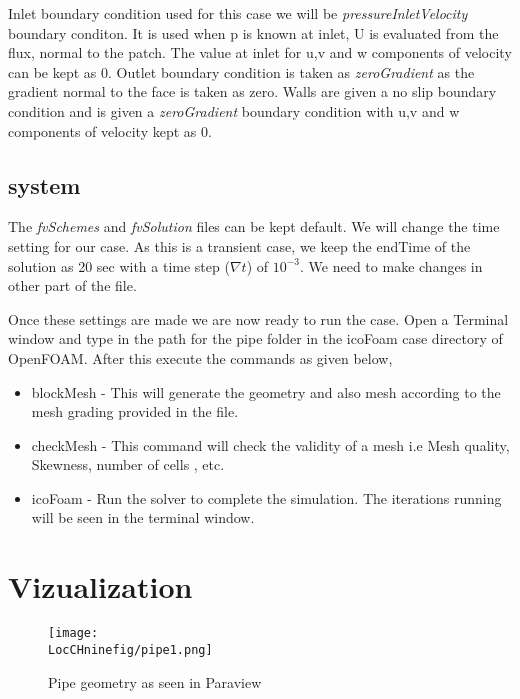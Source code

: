 Inlet boundary condition used for this case we will be \textit{pressureInletVelocity} boundary conditon. It is used when p is known at inlet, U is evaluated from the flux, normal to the patch. The value at inlet for u,v and w components of velocity can be kept as 0.  \newline
\flushleft Outlet boundary condition is taken as \textit{zeroGradient} as the gradient normal to the face is taken as zero. \newline
\flushleft Walls are given a no slip boundary condition and is given a \textit{zeroGradient} boundary condition with u,v and w components of velocity kept as 0.

\subsection{system}

The \textit{fvSchemes} and \textit{fvSolution} files can be kept default. We will change the time setting for our case. As this is a transient case, we keep the endTime of the solution as 20 sec with a time step ($\nabla t$) of $10^{-3}$. We need to make changes in other part of the file. \newline

\flushleft Once these settings are made we are now ready to run the case. Open a Terminal window and type in the path for the pipe folder in the icoFoam case directory of OpenFOAM. After this execute the commands as given below,

\begin{itemize}
\item blockMesh - This will generate the geometry and also mesh according to the mesh grading provided in the file. 
\item checkMesh - This command will check the validity of a mesh i.e Mesh quality, Skewness, number of cells , etc.
\item icoFoam - Run the solver to complete the simulation. The iterations running will be seen in the terminal window.
\end{itemize}

\section{Vizualization}

\begin{figure}[h]  
\centering
\texttt{[image: \\LocCHninefig/pipe1.png]}
\caption{Pipe geometry as seen in Paraview}
\label{pipe_geom}
\end{figure}

